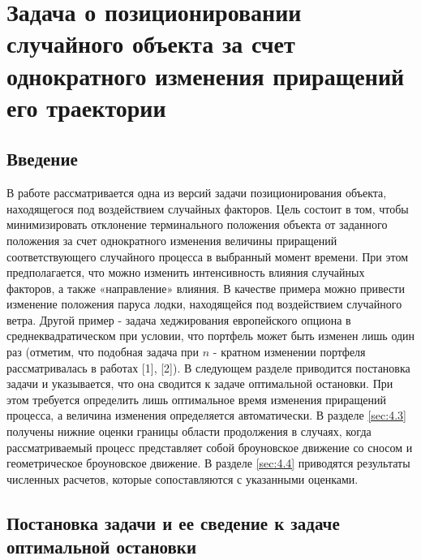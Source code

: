 \chapter{Задача о позиционировании случайного объекта за счет однократного изменения приращений его траектории} \label{chapt4}

\section{Введение}\label{sec:4.1}
В работе рассматривается одна из версий задачи позиционирования объекта, находящегося под воздействием случайных факторов. Цель состоит в том, чтобы минимизировать отклонение терминального положения объекта от заданного положения за счет однократного изменения величины приращений соответствующего случайного процесса в выбранный момент времени. При этом предполагается, что можно изменить интенсивность влияния случайных факторов, а также «направление» влияния. В качестве примера можно привести изменение положения паруса лодки, находящейся под воздействием случайного ветра. Другой пример - задача хеджирования европейского опциона в среднеквадратическом при условии, что портфель может быть изменен лишь один раз (отметим, что подобная задача при  $n$ - кратном изменении портфеля рассматривалась в работах [1], [2]).
В следующем разделе приводится постановка задачи и указывается, что она сводится к задаче оптимальной остановки. При этом требуется определить лишь оптимальное время изменения приращений процесса, а величина изменения определяется автоматически. В разделе \ref{sec:4.3} получены нижние оценки границы области продолжения в случаях, когда рассматриваемый процесс представляет собой броуновское движение со сносом и геометрическое броуновское движение. В разделе \ref{sec:4.4} приводятся результаты численных расчетов, которые сопоставляются с указанными оценками.

\section{Постановка задачи и ее сведение к задаче оптимальной остановки}\label{sec:4.2}

